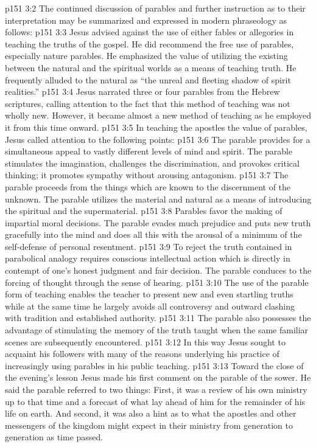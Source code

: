 \pc \vs p151 3:2 The continued discussion of parables and further instruction as to their interpretation may be summarized and expressed in modern phraseology as follows:
\pc \vs p151 3:3 \bibnobreakspace Jesus advised against the use of either fables or allegories in teaching the truths of the gospel. He did recommend the free use of parables, especially nature parables. He emphasized the value of utilizing the  existing between the natural and the spiritual worlds as a means of teaching truth. He frequently alluded to the natural as “the unreal and fleeting shadow of spirit realities.”
\pc \vs p151 3:4 \bibnobreakspace Jesus narrated three or four parables from the Hebrew scriptures, calling attention to the fact that this method of teaching was not wholly new. However, it became almost a new method of teaching as he employed it from this time onward.
\pc \vs p151 3:5 \bibnobreakspace In teaching the apostles the value of parables, Jesus called attention to the following points:
\vs p151 3:6 The parable provides for a simultaneous appeal to vastly different levels of mind and spirit. The parable stimulates the imagination, challenges the discrimination, and provokes critical thinking; it promotes sympathy without arousing antagonism.
\vs p151 3:7 The parable proceeds from the things which are known to the discernment of the unknown. The parable utilizes the material and natural as a means of introducing the spiritual and the supermaterial.
\vs p151 3:8 Parables favor the making of impartial moral decisions. The parable evades much prejudice and puts new truth gracefully into the mind and does all this with the arousal of a minimum of the self\hyp{}defense of personal resentment.
\vs p151 3:9 To reject the truth contained in parabolical analogy requires conscious intellectual action which is directly in contempt of one’s honest judgment and fair decision. The parable conduces to the forcing of thought through the sense of hearing.
\vs p151 3:10 The use of the parable form of teaching enables the teacher to present new and even startling truths while at the same time he largely avoids all controversy and outward clashing with tradition and established authority.
\vs p151 3:11 The parable also possesses the advantage of stimulating the memory of the truth taught when the same familiar scenes are subsequently encountered.
\pc \vs p151 3:12 In this way Jesus sought to acquaint his followers with many of the reasons underlying his practice of increasingly using parables in his public teaching.
\pc \vs p151 3:13 Toward the close of the evening’s lesson Jesus made his first comment on the parable of the sower. He said the parable referred to two things: First, it was a review of his own ministry up to that time and a forecast of what lay ahead of him for the remainder of his life on earth. And second, it was also a hint as to what the apostles and other messengers of the kingdom might expect in their ministry from generation to generation as time passed.\plusone

